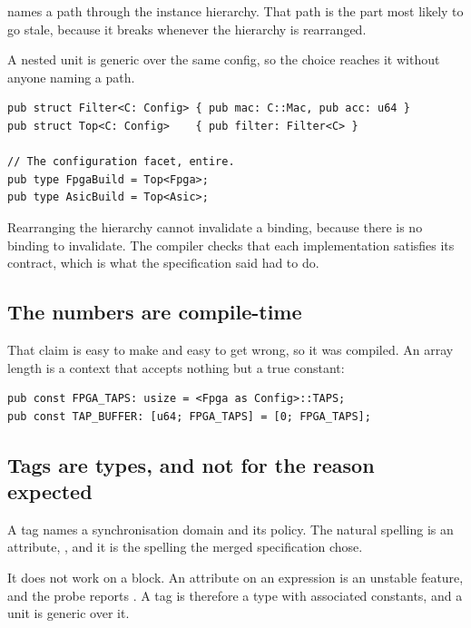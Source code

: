  names a path through the
instance hierarchy. That path is the part most likely to go stale, because
it breaks whenever the hierarchy is rearranged.

A nested unit is generic over the same config, so the choice reaches it
without anyone naming a path.

\begin{lstlisting}[caption={The path in a binding disappears. A nested unit is generic over the same config, so rearranging the hierarchy cannot invalidate anything.},label={lst:nesting}]
pub struct Filter<C: Config> { pub mac: C::Mac, pub acc: u64 }
pub struct Top<C: Config>    { pub filter: Filter<C> }

// The configuration facet, entire.
pub type FpgaBuild = Top<Fpga>;
pub type AsicBuild = Top<Asic>;
\end{lstlisting}

Rearranging the hierarchy cannot invalidate a binding, because there is no
binding to invalidate. The compiler checks that each implementation
satisfies its contract, which is what the specification said 
had to do.

\subsection{The numbers are compile-time}

That claim is easy to make and easy to get wrong, so it was compiled. An
array length is a context that accepts nothing but a true constant:

\begin{lstlisting}[caption={Proof that the config's numbers are compile-time: an array length accepts nothing else.},label={lst:const}]
pub const FPGA_TAPS: usize = <Fpga as Config>::TAPS;
pub const TAP_BUFFER: [u64; FPGA_TAPS] = [0; FPGA_TAPS];
\end{lstlisting}

\subsection{Tags are types, and not for the reason expected}

A tag names a synchronisation domain and its policy. The natural spelling
is an attribute, \code{\#[tag(MemFetch, handshake, capacity = 8)]}, and it
is the spelling the merged specification chose.

It does not work on a block. An attribute on an expression is an unstable
feature, and the probe reports . A tag is therefore a
type with associated constants, and a unit is generic over it.

